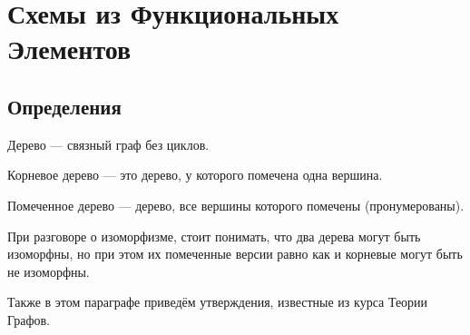 \chapter{Схемы из Функциональных Элементов}
\section{Определения}

\begin{definition}
	Дерево --- связный граф без циклов.
\end{definition}

\begin{definition}
	Корневое дерево --- это дерево, у которого помечена одна вершина.
\end{definition}

\begin{definition}
	Помеченное дерево --- дерево, все вершины которого помечены
	(пронумерованы).
\end{definition}

При разговоре о изоморфизме, стоит понимать, что два дерева могут быть
изоморфны, но при этом их помеченные версии равно как и корневые могут быть не
изоморфны.

Также в этом параграфе приведём утверждения, известные из курса Теории Графов.

